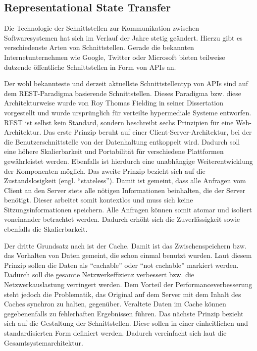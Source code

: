 \subsection{Representational State Transfer}

Die Technologie der Schnittstellen zur Kommunikation zwischen Softwaresystemen hat sich im Verlauf der Jahre stetig geändert. 
Hierzu gibt es verschiedenste Arten von Schnittstellen. 
Gerade die bekannten Internetunternehmen wie Google\autocite{MS-GoogleLLC.2020}, Twitter\autocite{MS-TwitterInc..01.03.2020} oder Microsoft\autocite{MS-MicrosoftCorporation.21.05.2018} bieten teilweise dutzende öffentliche Schnittstellen in Form von \acp{API} an.

Der wohl bekannteste und derzeit aktuellste Schnittstellentyp von \acp{API} sind auf dem \ac{REST}-Paradigma basierende Schnittstellen. 
Dieses Paradigma bzw. diese Architekturweise wurde von Roy Thomas Fielding in seiner Dissertation\autocite{MS-Fielding.} vorgestellt und wurde ursprünglich für verteilte hypermediale Systeme entworfen. 
\ac{REST} ist selbst kein Standard, sondern beschreibt sechs Prinzipien für eine Web-Architektur. 
Das erste Prinzip beruht auf einer Client-Server-Architektur, bei der die Benutzerschnittstelle von der Datenhaltung entkoppelt wird.
Dadurch soll eine höhere Skalierbarkeit und Portabilität für verschiedene Plattformen gewährleistet werden.
Ebenfalls ist hierdurch eine unabhängige Weiterentwicklung der Komponenten möglich. 
Das zweite Prinzip bezieht sich auf die Zustandslosigkeit (engl. \enquote{stateless}). 
Damit ist gemeint, dass alle Anfragen vom Client an den Server stets alle nötigen Informationen beinhalten, die der Server benötigt. 
Dieser arbeitet somit kontextlos und muss sich keine Sitzungsinformationen speichern. 
Alle Anfragen können somit atomar und isoliert voneinander betrachtet werden. Dadurch erhöht sich die Zuverlässigkeit sowie ebenfalls die Skalierbarkeit.

Der dritte Grundsatz nach \citeauthor{MS-Fielding.} ist der Cache. 
Damit ist das Zwischenspeichern bzw. das Vorhalten von Daten gemeint, die schon einmal benutzt wurden. 
Laut diesem Prinzip sollen die Daten als \enquote{cachable} oder \enquote{not cachable} markiert werden. 
Dadurch soll die gesamte Netzwerkeffizienz verbessert bzw. die Netzwerkauslastung verringert werden. 
Dem Vorteil der Performanceverbesserung steht jedoch die Problematik, das Original auf dem Server mit dem Inhalt des Caches synchron zu halten, gegenüber. 
Veraltete Daten im Cache können gegebenenfalls zu fehlerhaften Ergebnissen führen. 
Das nächste Prinzip bezieht sich auf die Gestaltung der Schnittstellen. 
Diese sollen in einer einheitlichen und standardisierten Form definiert werden. 
Dadurch vereinfacht sich laut \citeauthor{MS-Fielding.} die Gesamtsystemarchitektur. 

